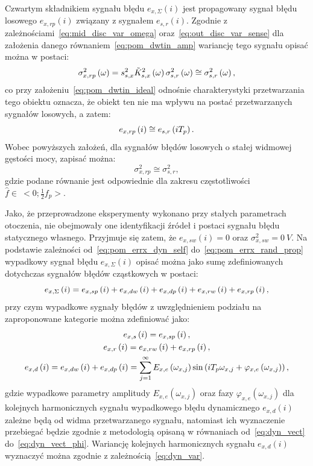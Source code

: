 Czwartym składnikiem sygnału błędu $e_{x,\Sigma}(i)$ jest propagowany sygnał błędu losowego $e_{x,rp}(i)$ związany z sygnałem $e_{s,r}(i)$. Zgodnie z zależnościami~\eqref{eq:mid_disc_var_omega} oraz~\eqref{eq:out_disc_var_sense} dla założenia danego równaniem~\eqref{eq:pom_dwtin_amp} wariancję tego sygnału opisać można w postaci:
\begin{equation}
\sigma_{x,rp}^{2} \left(\omega\right) = s_{s,x}^{2} \tilde{K}_{s,x}^{2} \left(\omega\right) \sigma_{s,r}^{2} \left(\omega\right) \cong \sigma_{s,r}^{2} \left(\omega\right) \label{eq:pom_varx_rand_prop_omega},
\end{equation}
co przy założeniu~\eqref{eq:pom_dwtin_ideal} odnośnie charakterystyki przetwarzania tego obiektu oznacza, że obiekt ten nie ma wpływu na postać przetwarzanych sygnałów losowych, a zatem:
\begin{equation}
e_{x,rp} \left(i\right) \cong e_{s,r} \left(i T_{p}\right) \label{eq:pom_errx_rand_prop}.
\end{equation}
Wobec powyższych założeń, dla sygnałów błędów losowych o stałej widmowej gęstości mocy, zapisać można:
\begin{equation}
\sigma_{x,rp}^{2} \cong \sigma_{s,r}^{2} \label{eq:pom_varx_rand_prop},
\end{equation}
gdzie podane równanie jest odpowiednie dla zakresu częstotliwości $\hat{f} \in~<0;\frac{1}{2} f_{p}>$.

Jako, że przeprowadzone eksperymenty wykonano przy stałych parametrach otoczenia, nie obejmowały one identyfikacji źródeł i postaci sygnału błędu statycznego własnego. Przyjmuje się zatem, że $e_{x,sw}(i) = 0$ oraz $\sigma_{x,sw}^{2} = \qty{0}{V}$. Na podstawie zależności od~\eqref{eq:pom_errx_dyn_self} do~\eqref{eq:pom_errx_rand_prop} wypadkowy sygnał błędu $e_{x,\Sigma}(i)$ opisać można jako sumę zdefiniowanych dotychczas sygnałów błędów cząstkowych w postaci:
\begin{equation}
e_{x,\Sigma} \left(i\right) = e_{x,sp} \left(i\right) + e_{x,dw} \left(i\right) + e_{x,dp} \left(i\right) + e_{x,rw} \left(i\right) + e_{x,rp} \left(i\right) \label{eq:pom_errx_sum},
\end{equation}
przy czym wypadkowe sygnały błędów z uwzględnieniem podziału na zaproponowane kategorie można zdefiniować jako:
\begin{gather}
e_{x,s} \left(i\right) = e_{x,sp} \left(i\right) \label{eq:pom_errx_stat}, \\
e_{x,r} \left(i\right) = e_{x,rw} \left(i\right) + e_{x,rp} \left(i\right) \label{eq:pom_errx_rand}, \\
e_{x,d} \left(i\right) = e_{x,dw} \left(i\right) + e_{x,dp} \left(i\right) = \sum _{j=1} ^{\infty} E_{x,e} \left(\omega_{x,j}\right) \sin \left(i T_{p} \omega_{x,j} + \varphi_{x,e} \left(\omega_{x,j}\right)\right) \label{eq:pom_errx_dyn},
\end{gather}
gdzie wypadkowe parametry amplitudy $E_{x,e}(\omega_{x,j})$ oraz fazy $\varphi_{x,e}(\omega_{x,j})$ dla kolejnych harmonicznych sygnału wypadkowego błędu dynamicznego $e_{x,d}(i)$ zależne będą od widma przetwarzanego sygnału, natomiast ich wyznaczenie przebiegać będzie zgodnie z metodologią opisaną w równaniach od~\eqref{eq:dyn_vect} do~\eqref{eq:dyn_vect_phi}. Wariancję kolejnych harmonicznych sygnału $e_{x,d}(i)$ wyznaczyć można zgodnie z zależnością~\eqref{eq:dyn_var}.

